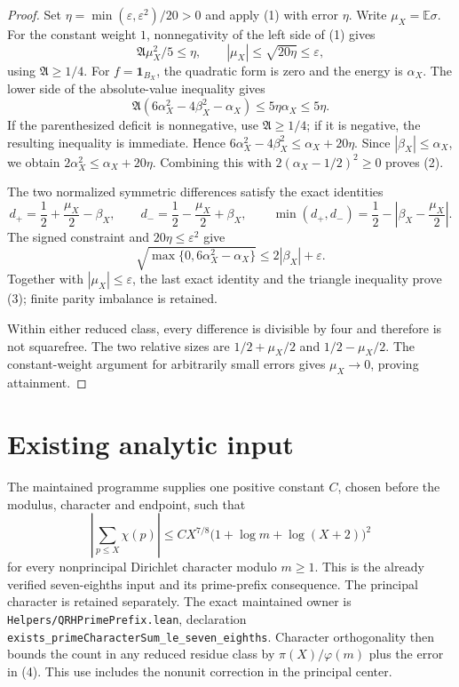 \documentclass[11pt]{article}
\newcommand{\E}{\mathbb E}
\newcommand{\Aconst}{\mathfrak A}
\begin{document}
\begin{proof}
Set \(\eta=\min(\varepsilon,\varepsilon^2)/20>0\) and apply (1)
with error \(\eta\). Write \(\mu_X=\E\sigma\). For the constant
weight \(1\), nonnegativity of the left side of (1) gives
\[
 \Aconst\mu_X^2/5\le\eta,\qquad |\mu_X|\le\sqrt{20\eta}
 \le\varepsilon,
\]
using \(\Aconst\ge1/4\).
For \(f=\mathbf1_{B_X}\), the quadratic form is zero and the energy
is \(\alpha_X\). The lower side of the absolute-value inequality gives
\[
 \Aconst(6\alpha_X^2-4\beta_X^2-\alpha_X)
 \le5\eta\alpha_X\le5\eta .
\]
If the parenthesized deficit is nonnegative, use \(\Aconst\ge1/4\);
if it is negative, the resulting inequality is immediate. Hence
\(6\alpha_X^2-4\beta_X^2\le\alpha_X+20\eta\).
Since \(|\beta_X|\le\alpha_X\), we obtain
\(2\alpha_X^2\le\alpha_X+20\eta\). Combining this with
\(2(\alpha_X-1/2)^2\ge0\) proves (2).

The two normalized symmetric differences satisfy the exact identities
\[
 d_+=\frac12+\frac{\mu_X}{2}-\beta_X,\qquad
 d_-=\frac12-\frac{\mu_X}{2}+\beta_X,\qquad
 \min(d_+,d_-)=\frac12-\left|\beta_X-\frac{\mu_X}{2}\right|.
\]
The signed constraint and \(20\eta\le\varepsilon^2\) give
\[
 \sqrt{\max\{0,6\alpha_X^2-\alpha_X\}}\le2|\beta_X|+\varepsilon.
\]
Together with \(|\mu_X|\le\varepsilon\), the last exact identity and
the triangle inequality prove (3); finite parity imbalance is retained.

Within either reduced class, every difference is divisible by four and
therefore is not squarefree. The two relative sizes are
\(1/2+\mu_X/2\) and \(1/2-\mu_X/2\). The constant-weight argument for
arbitrarily small errors gives \(\mu_X\to0\), proving attainment.
\end{proof}

\section{Existing analytic input}

The maintained programme supplies one positive constant \(C\), chosen
before the modulus, character and endpoint, such that
\[
 \left|\sum_{p\le X}\chi(p)\right|
 \le C X^{7/8}\bigl(1+\log m+\log(X+2)\bigr)^2        \tag{4}
\]
for every nonprincipal Dirichlet character modulo \(m\ge1\).
This is the already verified seven-eighths input and its prime-prefix
consequence. The principal character is retained separately.
The exact maintained owner is
\texttt{Helpers/QRHPrimePrefix.lean}, declaration
\texttt{exists\_primeCharacterSum\_le\_seven\_eighths}.
Character orthogonality then bounds the count in any reduced residue class
by \(\pi(X)/\varphi(m)\) plus the error in (4).
This use includes the nonunit correction in the principal center.
\end{document}
